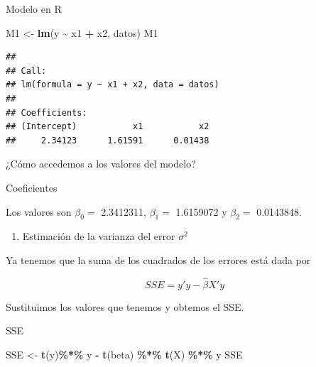 \documentclass[
]{book}
\newenvironment{Shaded}{\begin{snugshade}}{\end{snugshade}}
\newcommand{\DecValTok}[1]{\textcolor[rgb]{0.00,0.00,0.81}{#1}}
\newcommand{\FunctionTok}[1]{\textcolor[rgb]{0.13,0.29,0.53}{\textbf{#1}}}
\newcommand{\NormalTok}[1]{#1}
\newcommand{\OtherTok}[1]{\textcolor[rgb]{0.56,0.35,0.01}{#1}}
\newcommand{\SpecialCharTok}[1]{\textcolor[rgb]{0.81,0.36,0.00}{\textbf{#1}}}
\providecommand{\tightlist}{%
  \setlength{\itemsep}{0pt}\setlength{\parskip}{0pt}}
\begin{document}
Modelo en R

\begin{Shaded}
\begin{Highlighting}[]
\NormalTok{M1 }\OtherTok{\textless{}{-}} \FunctionTok{lm}\NormalTok{(y }\SpecialCharTok{\textasciitilde{}}\NormalTok{ x1 }\SpecialCharTok{+}\NormalTok{ x2, datos)}
\NormalTok{M1 }
\end{Highlighting}
\end{Shaded}

\begin{verbatim}
## 
## Call:
## lm(formula = y ~ x1 + x2, data = datos)
## 
## Coefficients:
## (Intercept)           x1           x2  
##     2.34123      1.61591      0.01438
\end{verbatim}

¿Cómo accedemos a los valores del modelo?

Coeficientes

\begin{Shaded}
\end{Shaded}

Los valores son \(\beta_0=\) 2.3412311, \(\beta_1=\) 1.6159072 y \(\beta_2=\) 0.0143848.

\begin{enumerate}
\def\labelenumi{\arabic{enumi})}
\setcounter{enumi}{1}
\tightlist
\item
  Estimación de la varianza del error \(\sigma^2\)
\end{enumerate}

Ya tenemos que la suma de los cuadrados de los errores está dada por

\[ SSE = y'y - \hat{\beta}X'y\]

Sustituimos los valores que tenemos y obtemos el SSE.

SSE

\begin{Shaded}
\begin{Highlighting}[]
\NormalTok{SSE }\OtherTok{\textless{}{-}} \FunctionTok{t}\NormalTok{(y)}\SpecialCharTok{\%*\%}\NormalTok{ y }\SpecialCharTok{{-}} \FunctionTok{t}\NormalTok{(beta) }\SpecialCharTok{\%*\%} \FunctionTok{t}\NormalTok{(X) }\SpecialCharTok{\%*\%}\NormalTok{ y}
\NormalTok{SSE}
\end{Highlighting}
\end{Shaded}
\end{document}
